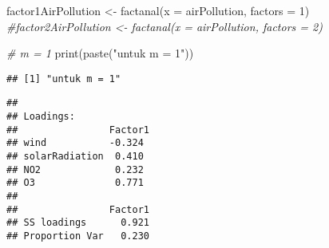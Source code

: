 \documentclass[
]{article}
\newenvironment{Shaded}{\begin{snugshade}}{\end{snugshade}}
\newcommand{\AttributeTok}[1]{\textcolor[rgb]{0.77,0.63,0.00}{#1}}
\newcommand{\CommentTok}[1]{\textcolor[rgb]{0.56,0.35,0.01}{\textit{#1}}}
\newcommand{\ControlFlowTok}[1]{\textcolor[rgb]{0.13,0.29,0.53}{\textbf{#1}}}
\newcommand{\DecValTok}[1]{\textcolor[rgb]{0.00,0.00,0.81}{#1}}
\newcommand{\FunctionTok}[1]{\textcolor[rgb]{0.00,0.00,0.00}{#1}}
\newcommand{\NormalTok}[1]{#1}
\newcommand{\OtherTok}[1]{\textcolor[rgb]{0.56,0.35,0.01}{#1}}
\newcommand{\SpecialCharTok}[1]{\textcolor[rgb]{0.00,0.00,0.00}{#1}}
\newcommand{\StringTok}[1]{\textcolor[rgb]{0.31,0.60,0.02}{#1}}
\begin{document}
\begin{Shaded}
\begin{Highlighting}[]
\NormalTok{factor1AirPollution }\OtherTok{\textless{}{-}} \FunctionTok{factanal}\NormalTok{(}\AttributeTok{x =}\NormalTok{ airPollution, }\AttributeTok{factors =} \DecValTok{1}\NormalTok{)}
\CommentTok{\#factor2AirPollution \textless{}{-} factanal(x = airPollution, factors = 2)}

\CommentTok{\# m = 1}
\FunctionTok{print}\NormalTok{(}\FunctionTok{paste}\NormalTok{(}\StringTok{"untuk m = 1"}\NormalTok{))}
\end{Highlighting}
\end{Shaded}

\begin{verbatim}
## [1] "untuk m = 1"
\end{verbatim}

\begin{Shaded}
\end{Shaded}

\begin{verbatim}
## 
## Loadings:
##                Factor1
## wind           -0.324 
## solarRadiation  0.410 
## NO2             0.232 
## O3              0.771 
## 
##                Factor1
## SS loadings      0.921
## Proportion Var   0.230
\end{verbatim}

\begin{Shaded}
\end{Shaded}
\end{document}
